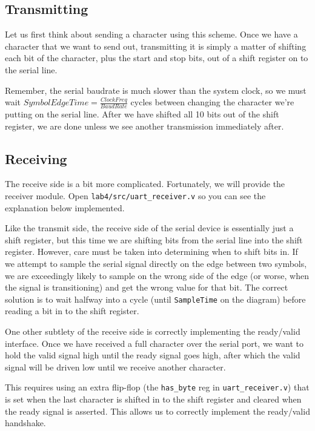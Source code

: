 \documentclass[11pt]{article}
\begin{document}
\subsection{Transmitting}
Let us first think about sending a character using this scheme. Once we have a character that we want to send out, transmitting it is simply a matter of shifting each bit of the character, plus the start and stop bits, out of a shift register on to the serial line. 

Remember, the serial baudrate is much slower than the system clock, so we must wait $SymbolEdgeTime = \frac{ClockFreq}{BaudRate}$ cycles between changing the character we're putting on the serial line. After we have shifted all 10 bits out of the shift register, we are done unless we see another transmission immediately after.

\subsection{Receiving}
The receive side is a bit more complicated. Fortunately, we will provide the receiver module. Open \verb|lab4/src/uart_receiver.v| so you can see the explanation below implemented. 

Like the transmit side, the receive side of the serial device is essentially just a shift register, but this time we are shifting bits from the serial line into the shift register. However, care must be taken into determining when to shift bits in. If we attempt to sample the serial signal directly on the edge between two symbols, we are exceedingly likely to sample on the wrong side of the edge (or worse, when the signal is transitioning) and get the wrong value for that bit. The correct solution is to wait halfway into a cycle (until \verb|SampleTime| on the diagram) before reading a bit in to the shift register.

One other subtlety of the receive side is correctly implementing the ready/valid interface. Once we have received a full character over the serial port, we want to hold the valid signal high until the ready signal goes high, after which the valid signal will be driven low until we receive another character. 

This requires using an extra flip-flop (the \verb|has_byte| reg in \verb|uart_receiver.v|) that is set when the last character is shifted in to the shift register and cleared when the ready signal is asserted. This allows us to correctly implement the ready/valid handshake.
\end{document}
